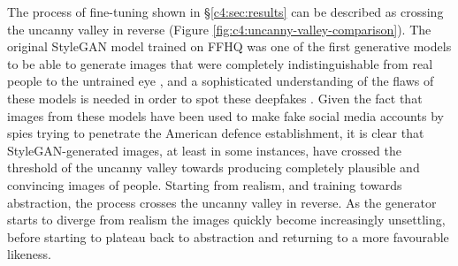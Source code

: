 The process of fine-tuning shown in \S \ref{c4:sec:results} can be described as crossing the uncanny valley in reverse (Figure \ref{fig:c4:uncanny-valley-comparison}).
The original StyleGAN model trained on FFHQ was one of the first generative models to be able to generate images that were completely indistinguishable from real people to the untrained eye \citep{ajder2019state}, and a sophisticated understanding of the flaws of these models is needed in order to spot these deepfakes \citep{mcdonald2018how}. 
Given the fact that images from these models have been used to make fake social media accounts \citep{satter2019spy} by spies trying to penetrate the American defence establishment, it is clear that StyleGAN-generated images, at least in some instances, have crossed the threshold of the uncanny valley towards producing completely plausible and convincing images of people.
Starting from realism, and training towards abstraction, the process crosses the uncanny valley in reverse. 
As the generator starts to diverge from realism the images quickly become increasingly unsettling, before starting to plateau back to abstraction and returning to a more favourable likeness.

